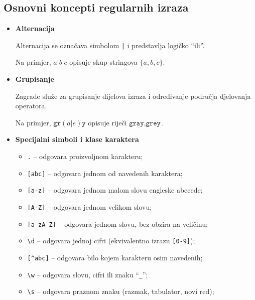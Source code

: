 \subsection{Osnovni koncepti regularnih izraza}

\begin{itemize}
	
	\item \textbf{Alternacija}
	
	Alternacija se označava simbolom \texttt{|} i predstavlja logičko ``ili''.
	
	Na primjer, 	$a|b|c $ opisuje skup stringova  $
	\{a,b,c\}.$
	
	\item \textbf{Grupisanje}
	
	Zagrade služe za grupisanje dijelova izraza i određivanje područja djelovanja operatora.
	
	Na primjer, $\texttt{gr}(a|e)\texttt{y}$ opisuje riječi $
	{\texttt{gray},\texttt{grey}}.
	$
	
	\item \textbf{Specijalni simboli i klase karaktera}
	
	\begin{itemize}
		
		\item \texttt{.} -- odgovara proizvoljnom karakteru;
		
		\item \texttt{[abc]} -- odgovara jednom od navedenih karaktera;
		
		\item \texttt{[a-z]} -- odgovara jednom malom slovu engleske abecede;
		
		\item \texttt{[A-Z]} -- odgovara jednom velikom slovu;
		
		\item \texttt{[a-zA-Z]} -- odgovara jednom slovu, bez obzira na veličinu;
		
		\item \texttt{\textbackslash d} -- odgovara jednoj cifri (ekvivalentno izrazu \texttt{[0-9]});
		
		\item \texttt{[\^{}abc]} -- odgovara bilo kojem karakteru osim navedenih;
		
		\item \texttt{\textbackslash w} -- odgovara slovu, cifri ili znaku ``\texttt{\_}'';
		
		\item \texttt{\textbackslash s} -- odgovara praznom znaku (razmak, tabulator, novi red);
		

\end{itemize}
\end{itemize}
